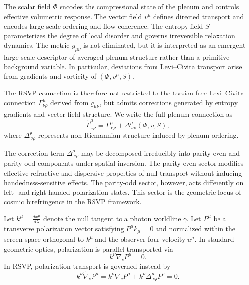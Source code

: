 \documentclass[12pt]{article}
\begin{document}
The scalar field $\Phi$ encodes the compressional state of the plenum and controls effective volumetric response. The vector field $v^\mu$ defines directed transport and encodes large-scale ordering and flow coherence. The entropy field $S$ parameterizes the degree of local disorder and governs irreversible relaxation dynamics. The metric $g_{\mu\nu}$ is not eliminated, but it is interpreted as an emergent large-scale descriptor of averaged plenum structure rather than a primitive background variable. In particular, deviations from Levi--Civita transport arise from gradients and vorticity of $(\Phi, v^\mu, S)$.

The RSVP connection is therefore not restricted to the torsion-free Levi--Civita connection $\Gamma^\mu_{\nu\rho}$ derived from $g_{\mu\nu}$, but admits corrections generated by entropy gradients and vector-field structure. We write the full plenum connection as
\begin{equation}
\widetilde{\Gamma}^\mu_{\ \nu\rho}
=
\Gamma^\mu_{\ \nu\rho}
+
\Delta^\mu_{\ \nu\rho}(\Phi, v, S),
\end{equation}
where $\Delta^\mu_{\ \nu\rho}$ represents non-Riemannian structure induced by plenum ordering.

The correction term $\Delta^\mu_{\ \nu\rho}$ may be decomposed irreducibly into parity-even and parity-odd components under spatial inversion. The parity-even sector modifies effective refractive and dispersive properties of null transport without inducing handedness-sensitive effects. The parity-odd sector, however, acts differently on left- and right-handed polarization states. This sector is the geometric locus of cosmic birefringence in the RSVP framework.

Let $k^\mu = \frac{dx^\mu}{d\lambda}$ denote the null tangent to a photon worldline $\gamma$. Let $P^\mu$ be a transverse polarization vector satisfying $P^\mu k_\mu = 0$ and normalized within the screen space orthogonal to $k^\mu$ and the observer four-velocity $u^\mu$. In standard geometric optics, polarization is parallel transported via
\begin{equation}
k^\nu \nabla_\nu P^\mu = 0.
\end{equation}
In RSVP, polarization transport is governed instead by
\begin{equation}
k^\nu \widetilde{\nabla}_\nu P^\mu
=
k^\nu \nabla_\nu P^\mu
+
k^\nu \Delta^\mu_{\ \nu\rho} P^\rho
=
0.
\end{equation}
\end{document}
